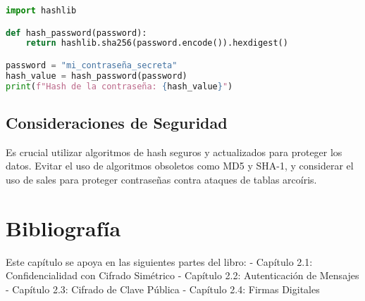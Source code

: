 \begin{lstlisting}[language=Python, caption=Implementación de Hashing en SecureShop]
import hashlib

def hash_password(password):
    return hashlib.sha256(password.encode()).hexdigest()

password = "mi_contraseña_secreta"
hash_value = hash_password(password)
print(f"Hash de la contraseña: {hash_value}")
\end{lstlisting}

\subsection{Consideraciones de Seguridad}
Es crucial utilizar algoritmos de hash seguros y actualizados para proteger los datos. Evitar el uso de algoritmos obsoletos como MD5 y SHA-1, y considerar el uso de sales para proteger contraseñas contra ataques de tablas arcoíris.

\section{Bibliografía}
Este capítulo se apoya en las siguientes partes del libro:
- Capítulo 2.1: Confidencialidad con Cifrado Simétrico
- Capítulo 2.2: Autenticación de Mensajes
- Capítulo 2.3: Cifrado de Clave Pública
- Capítulo 2.4: Firmas Digitales
